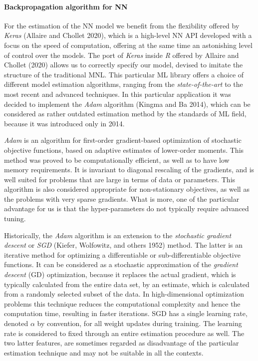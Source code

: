 \documentclass[12pt,]{article}
\let\oldparagraph\paragraph
\renewcommand{\paragraph}[1]{\oldparagraph{#1}\mbox{}}
\begin{document}
\hypertarget{backpropagation-algorithm-for-nn}{%
\paragraph{Backpropagation algorithm for
NN}\label{backpropagation-algorithm-for-nn}}

For the estimation of the NN model we benefit from the flexibility
offered by \emph{Keras} (Allaire and Chollet 2020), which is a
high-level NN API developed with a focus on the speed of computation,
offering at the same time an astonishing level of control over the
models. The port of \emph{Keras} inside \emph{R} offered by Allaire and
Chollet (2020) allows us to correctly specify our model, devised to
imitate the structure of the traditional MNL. This particular ML library
offers a choice of different model estimation algorithms, ranging from
the \emph{state-of-the-art} to the most recent and advanced techniques.
In this particular application it was decided to implement the
\emph{Adam} algorithm (Kingma and Ba 2014), which can be considered as
rather outdated estimation method by the standards of ML field, because
it was introduced only in 2014.

\emph{Adam} is an algorithm for first-order gradient-based optimization
of stochastic objective functions, based on adaptive estimates of
lower-order moments. This method was proved to be computationally
efficient, as well as to have low memory requirements. It is invariant
to diagonal rescaling of the gradients, and is well suited for problems
that are large in terms of data or parameters. This algorithm is also
considered appropriate for non-stationary objectives, as well as the
problems with very sparse gradients. What is more, one of the particular
advantage for us is that the hyper-parameters do not typically require
advanced tuning.

Historically, the \emph{Adam} algorithm is an extension to the
\emph{stochastic gradient descent} or \emph{SGD} (Kiefer, Wolfowitz, and
others 1952) method. The latter is an iterative method for optimizing a
differentiable or sub-differentiable objective functions. It can be
considered as a stochastic approximation of the \emph{gradient descent}
(GD) optimization, because it replaces the actual gradient, which is
typically calculated from the entire data set, by an estimate, which is
calculated from a randomly selected subset of the data. In
high-dimensional optimization problems this technique reduces the
computational complexity and hence the computation time, resulting in
faster iterations. SGD has a single learning rate, denoted \(\alpha\) by
convention, for all weight updates during training. The learning rate is
considered to fixed through an entire estimation procedure as well. The
two latter features, are sometimes regarded as disadvantage of the
particular estimation technique and may not be suitable in all the
contexts.
\end{document}
